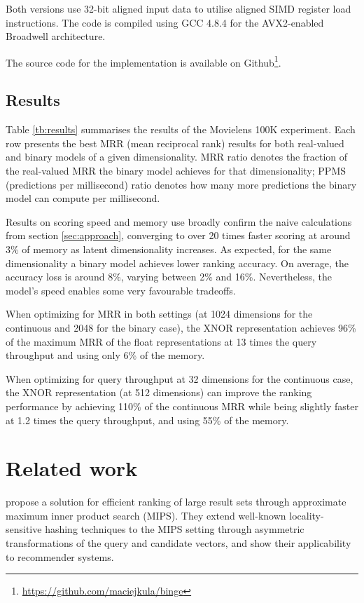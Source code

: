 \documentclass[sigchi]{acmart}
\begin{document}
Both versions use 32-bit aligned input data to utilise aligned SIMD register load instructions. The code is compiled using GCC 4.8.4 for the AVX2-enabled Broadwell architecture.

The source code for the implementation is available on Github\footnote{\url{https://github.com/maciejkula/binge}}.

\subsection{Results}
\label{sec:results}
Table \ref{tb:results} summarises the results of the Movielens 100K experiment. Each row presents the best MRR (mean reciprocal rank) results for both real-valued and binary models of a given dimensionality. MRR ratio denotes the fraction of the real-valued MRR the binary model achieves for that dimensionality; PPMS (predictions per millisecond) ratio denotes how many more predictions the binary model can compute per millisecond.

Results on scoring speed and memory use broadly confirm the naive calculations from section \ref{sec:approach}, converging to over 20 times faster scoring at around 3\% of memory as latent dimensionality increases.
As expected, for the same dimensionality a binary model achieves lower ranking accuracy. On average, the accuracy loss is around 8\%, varying between 2\% and 16\%.
Nevertheless, the model's speed enables some very favourable tradeoffs.

When optimizing for MRR in both settings (at 1024 dimensions for the continuous and 2048 for the binary case), the XNOR representation achieves 96\% of the maximum MRR of the float representations at 13 times the query throughput and using only 6\% of the memory.

When optimizing for query throughput at 32 dimensions for the continuous case, the XNOR representation (at 512 dimensions) can improve the ranking performance by achieving 110\% of the continuous MRR while being slightly faster at 1.2 times the query throughput, and using 55\% of the memory.

\section{Related work}
\citet{shrivastava2014asymmetric} propose a solution for efficient ranking of large result sets through approximate maximum inner product search (MIPS). They extend well-known \citep{indyk1998approximate} locality-sensitive hashing techniques to the MIPS setting through asymmetric transformations of the query and candidate vectors, and show their applicability to recommender systems.
\end{document}
